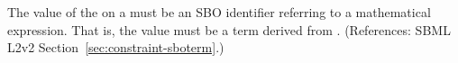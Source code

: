 The value of the   on a \Constraint must be an SBO
identifier referring to a mathematical expression.  That is, the value must
be a term derived from \sbomathformula.  (References: SBML L2v2
Section~\ref{sec:constraint-sboterm}.)
